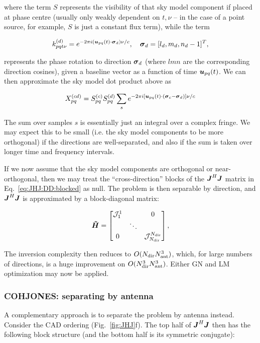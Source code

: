 \documentclass[useAMS,usenatbib]{mn2e}
\makeatletter
\newcommand{\mat}[1]{{\bmath{#1}}}
\newcommand{\JJ}{\mat{J}} %
\newcommand{\HHa}{\mat{\tilde{H}}} %
\newcommand{\JHJ}{\JJ^H\JJ} %
\newcommand{\Matrix}[2]{\left [ \begin{array}{@{}#1@{}}#2\end{array} \right ]}
\makeatother
\begin{document}
where the term $S$ represents the visibility of that sky model component if placed at phase centre (usually 
only weakly dependent on $t,\nu$ -- in the case of a point source, for example, $S$ is just a constant flux term),
while the term

\[
k^{(d)}_{pqt\nu} = e^{-2\pi i (\bmath{u}_{pq}(t)\cdot\bmath{\sigma}_d)\nu/c},~~~\bmath{\sigma}_d = [l_d,m_d,n_d-1]^T,
\]

represents the phase rotation to direction $\bmath{\sigma}_d$ (where $lmn$ are the corresponding direction cosines), 
given a baseline vector as a function of time $\bmath{u}_{pq}(t)$. We can then approximate the sky model dot product above as

\[
X_{pq}^{(cd)} = S^{(c)}_{pq}S^{(d)}_{pq} \sum_s e^{-2\pi i [\bmath{u}_{pq}(t)\cdot(\bmath{\sigma}_c-\bmath{\sigma}_d) ]\nu/c}
\]

The sum over samples $s$ is essentially just an integral over a complex fringe. We may expect this to be small (i.e. the
sky model components to be more orthogonal) if the directions are well-separated, and also if the sum is taken 
over longer time and frequency intervals. 

If we now assume that the sky model components are orthogonal or near-orthogonal, then 
we may treat the ``cross-direction'' blocks of the $\JHJ$ matrix in Eq.~\ref{eq:JHJ:DD:blocked} as null. The problem is 
then separable by direction, and $\JHJ$ is approximated by a block-diagonal matrix:


\begin{equation}
\label{eq:JHJ:DD:block-diag}
\HHa = \Matrix{ccc}{\JJJ^1_1 &  & 0 \\
& \ddots &  \\
0 & & \JJJ_{\Nd}^{\Nd} },
\end{equation}

The inversion complexity then reduces to $O(N_\mathrm{dir}N_\mathrm{ant}^3)$, which, for large numbers of directions, is a huge improvement on 
$O(N_\mathrm{dir}^3N_\mathrm{ant}^3)$. Either GN and LM optimization may now be applied. 



\subsubsection{COHJONES: separating by antenna}

A complementary approach is to separate the problem by antenna instead. Consider the CAD ordering (Fig.~\ref{fig:JHJ}f). 
The top half of $\JHJ$ then has the following block structure (and the bottom half is its symmetric conjugate):
\end{document}
